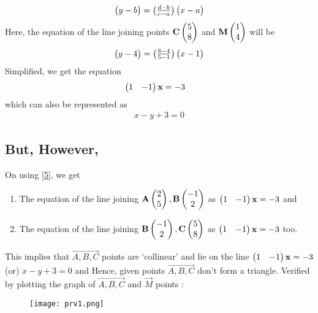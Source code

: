 \documentclass[journal,12pt,twocolumn]{IEEEtran}
\begin{document}
\begin{align}
    \begin{pmatrix}y-b\end{pmatrix} = {\begin{pmatrix}\frac{d-b}{c-a}\end{pmatrix}}\begin{pmatrix}x-a\end{pmatrix} \label{5}
\end{align}
Here, the equation of the line joining points $\mathbf{C}\begin{pmatrix}5\\8\end{pmatrix}$ and $\mathbf{M}\begin{pmatrix}1\\4\end{pmatrix}$ will be
\begin{align}
    \begin{pmatrix}y-4\end{pmatrix} = \begin{pmatrix}\frac{8-4}{5-1}\end{pmatrix}\begin{pmatrix}x-1\end{pmatrix} \label{6}
\end{align}
Simplified, we get the equation
\begin{align}
    \begin{pmatrix}1 & - 1\end{pmatrix}\mathbf{x} &= -3 
\end{align}
 which can also be represented as 
 \begin{align}
     x-y+3=0
 \end{align}
\subsection*{But, However,} On using \eqref{5}, we get
\newline
\begin{enumerate}
    \item The equation of the line joining $\mathbf{A}\begin{pmatrix}2\\5\end{pmatrix}, \mathbf{B}\begin{pmatrix}-1\\2\end{pmatrix}$ as $\begin{pmatrix}1 & - 1\end{pmatrix}\mathbf{x} = -3$ and 
    \newline
    \item The equation of the line joining $\mathbf{B}\begin{pmatrix}-1\\2\end{pmatrix}, \mathbf{C}\begin{pmatrix}5\\8\end{pmatrix}$ as $\begin{pmatrix}1 & - 1\end{pmatrix}\mathbf{x}=-3$ too.\newline
\end{enumerate}
 This implies that $\vec{A,B,C}$ points are `collinear' and lie on the line $\begin{pmatrix}1 & - 1\end{pmatrix}\mathbf{x} = -3$ (or) $x-y+3=0$ and Hence, given points $\vec{A,B,C}$ don't form a triangle.
\newline\newline
Verified by plotting the graph of $\vec{A,B,C}$ and $\vec{M}$ points :
 
\begin{figure}[ht!]
\centering
\texttt{[image: prv1.png]}
\end{figure}
 
\end{document}
